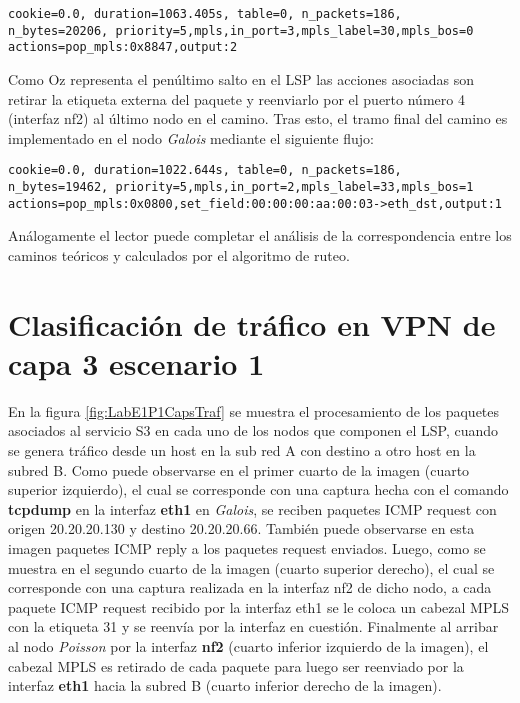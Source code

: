 \begin{center}
\texttt{cookie=0.0, duration=1063.405s, table=0, n\_packets=186, \\
n\_bytes=20206, priority=5,mpls,in\_port=3,mpls\_label=30,mpls\_bos=0 \\
actions=pop\_mpls:0x8847,output:2 }
\end{center}

Como Oz representa el penúltimo salto en el LSP las acciones asociadas son retirar la etiqueta externa del paquete y reenviarlo por el puerto n\'umero 4 (interfaz nf2) al \'ultimo nodo en el camino. Tras esto, el tramo final del camino es implementado en el nodo \textit{Galois} mediante el siguiente flujo:

\begin{center}
\texttt{cookie=0.0, duration=1022.644s, table=0, n\_packets=186, \\
n\_bytes=19462, priority=5,mpls,in\_port=2,mpls\_label=33,mpls\_bos=1 \\
actions=pop\_mpls:0x0800,set\_field:00:00:00:aa:00:03->eth\_dst,output:1 }
\end{center}

Análogamente el lector puede completar el análisis de la correspondencia entre los caminos te\'oricos y calculados por el algoritmo de ruteo.

\section{Clasificación de tr\'afico en VPN de capa 3 escenario 1}
\label{appendix6.2}

En la figura \ref{fig:LabE1P1CapsTraf} se muestra el procesamiento de los paquetes asociados al servicio S3 en cada uno de los nodos que componen el LSP, cuando se genera tr\'afico desde un host en la sub red A con destino a otro host en la subred B. Como puede observarse en el primer cuarto de la imagen (cuarto superior izquierdo), el cual se corresponde con una captura hecha con el comando \textbf{tcpdump} en la interfaz \textbf{eth1} en \textit{Galois}, se reciben paquetes ICMP request con origen 20.20.20.130 y destino 20.20.20.66. Tambi\'en puede observarse en esta imagen paquetes ICMP reply a los paquetes request enviados. Luego, como se muestra en el segundo cuarto de la imagen (cuarto superior derecho), el cual se corresponde con una captura realizada en la interfaz nf2 de dicho nodo, a cada paquete ICMP request recibido por la interfaz eth1 se le coloca un cabezal MPLS con la etiqueta 31 y se reenvía por la interfaz en cuestión. Finalmente al arribar al nodo \textit{Poisson} por la interfaz \textbf{nf2} (cuarto inferior izquierdo de la imagen), el cabezal MPLS es retirado de cada paquete para luego ser reenviado por la interfaz \textbf{eth1} hacia la subred B (cuarto inferior derecho de la imagen).


